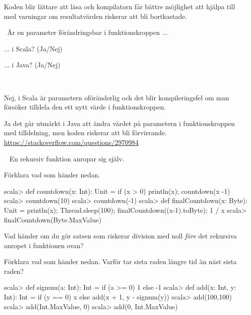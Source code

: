 \SubtaskSolved  Koden blir lättare att läsa och kompilatorn får bättre möjlighet att hjälpa till med varningar om resultatvärden riskerar att bli bortkastade.

\QUESTEND


\clearpage

\AdvancedTasks %





\QUESTBEGIN

\Task \what~Är en parameter förändringsbar i funktionskroppen ...

\Subtask ... i Scala?  (Ja/Nej)

\Subtask ... i Java?  (Ja/Nej)

\SOLUTION

\TaskSolved \what~

\Subtask Nej, i Scala är parametern oföränderlig och det blir kompileringsfel om man försöker tilldela den ett nytt värde i funktionskroppen.

\Subtask Ja det går utmärkt i Java att ändra värdet på parametern i funktionskroppen med tilldelning, men koden riskerar att bli förvirrande.\\
\url{https://stackoverflow.com/questions/2970984}

\QUESTEND





\QUESTBEGIN

\Task  \what~  En rekursiv funktion anropar sig själv.

\Subtask Förklara vad som händer nedan.

\begin{REPL}
scala> def countdown(x: Int): Unit = if (x > 0) {println(x); countdown(x -1)}
scala> countdown(10)
scala> countdown(-1)
scala> def finalCountdown(x: Byte): Unit =
         {println(x); Thread.sleep(100); finalCountdown((x-1).toByte); 1 / x}
scala> finalCountdown(Byte.MaxValue)
\end{REPL}

\Subtask Vad händer om du gör satsen som riskerar division med noll \emph{före} det rekursiva anropet i funktionen  ovan?

\Subtask Förklara vad som händer nedan. Varför tar sista raden längre tid än näst sista raden?
\begin{REPL}
scala> def signum(a: Int): Int = if (a >= 0) 1 else -1
scala> def add(x: Int, y: Int): Int =
         if (y == 0) x else add(x + 1, y - signum(y))
scala> add(100,100)
scala> add(Int.MaxValue, 0)
scala> add(0, Int.MaxValue)
\end{REPL}

